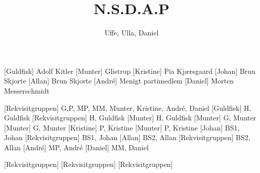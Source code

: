 \documentclass[a4paper,11pt]{article}
\title{N.S.D.A.P}
\author{Uffe, Ulla, Daniel}
\begin{document}
\maketitle

\begin{roles}
[Guldfisk] Adolf Kitler
[Munter] Glistrup
[Kristine] Pia Kjærsgaard
[Johan] Brun Skjorte 
[Allan] Brun Skjorte
[André] Menigt partimedlem
[Daniel] Morten Messerschmidt
\end{roles}

\begin{props}
[Rekvisitgruppen] G,P, MP, MM, Munter, Kristine, André, Daniel
[Guldfisk] H, Guldfisk
[Rekvisitgruppen] H, Guldfisk
[Munter] H, Guldfisk
[Munter] G, Munter 
[Munter] G, Munter
[Kristine] P, Kristine
[Munter] P, Kristine
[Johan] BS1, Johan
[Rekvisitgruppen] BS1, Johan
[Allan] BS2, Allan
[Rekvisitgruppen] BS2, Allan
[André] MP, André
[Daniel] MM, Daniel 


[Rekvisitgruppen] 
[Rekvisitgruppen] 
[Rekvisitgruppen] 
\end{props}
\end{document}
